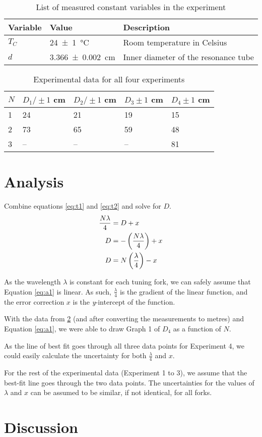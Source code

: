 \documentclass[letter]{article}
\numberwithin{equation}{section}
\begin{document}
\begin{table}[!h]
  \centering
  \begin{tabular}{|l|l|l|}
    \hline
    Variable  & Value                       & Description\\
    \hline
    \(T_C\)   & \SI{24(1)}{\celsius}        & {Room temperature in Celsius}\\
    \(d\)     & \SI{3.366(2)}{\centi\metre} & {Inner diameter of the resonance tube}\\
    \hline
  \end{tabular}
  \caption{List of measured constant variables in the experiment}
  \label{table:d2}
\end{table}

\begin{table}[!h]
  \centering
  \begin{tabular}{|l|l|l|l|l|}
    \hline
    \(N\) & \(D_1 / \pm 1\) \si{cm} & \(D_2 / \pm 1\) \si{cm} & \(D_3 \pm 1\) \si{cm} & \(D_4 \pm 1\) \si{cm} \\
    \hline
    1  & 24  & 21  & 19  & 15 \\
    2  & 73  & 65  & 59  & 48 \\
    3  & --  & --  & --  & 81 \\
    \hline
  \end{tabular}
  \caption{Experimental data for all four experiments}
  \label{table:d3}
\end{table}

\section{Analysis}
Combine equations \eqref{eq:t1} and \eqref{eq:t2} and solve for \(D\).
\begin{align} \label{eq:a1}
  \frac{N \lambda}{4} &= D + x \notag \\
  D &= - \left (\frac{N \lambda}{4} \right) + x \notag \\
  D &= N \left(\frac{\lambda}{4} \right) - x
\end{align}

As the wavelength \(\lambda\) is constant for each tuning fork, we can safely assume that Equation \eqref{eq:a1} is linear. As such, \(\frac{\lambda}{4}\) is the gradient of the linear function, and the error correction \(x\) is the \textit{y}-intercept of the function.

With the data from \ref{table:d3} (and after converting the measurements to metres) and Equation \eqref{eq:a1}, we were able to draw Graph 1 of \(D_4\) as a function of \(N\).

As the line of best fit goes through all three data points for Experiment 4, we could easily calculate the uncertainty for both \(\frac{\lambda}{4}\) and \(x\).

For the rest of the experimental data (Experiment 1 to 3), we assume that the best-fit line goes through the two data points. The uncertainties for the values of \(\lambda\) and \(x\) can be assumed to be similar, if not identical, for all forks.

\section{Discussion}
\end{document}
